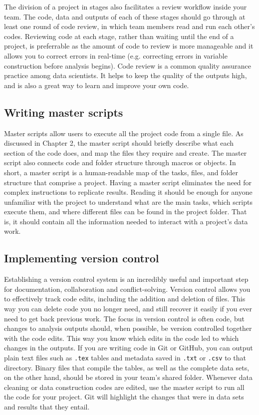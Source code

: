 The division of a project in stages also facilitates a review workflow inside your team.
The code, data and outputs of each of these stages should go through at least one round of code review,
in which team members read and run each other's codes.
Reviewing code at each stage, rather than waiting until the end of a project,
is preferrable as the amount of code to review is more manageable and 
it allows you to correct errors in real-time (e.g. correcting errors in variable construction before analysis begins). 
Code review is a common quality assurance practice among data scientists.
It helps to keep the quality of the outputs high, and is also a great way to learn and improve your own code.

\subsection{Writing master scripts}

Master scripts allow users to execute all the project code from a single file.
As discussed in Chapter 2, the master script should briefly describe what each 
section of the code does, and map the files they require and create.
The master script also connects code and folder structure through macros or objects.
In short, a master script is a human-readable map of the tasks,
files, and folder structure that comprise a project.
Having a master script eliminates the need for complex instructions to replicate results.
Reading it should be enough for anyone unfamiliar with the project
to understand what are the main tasks, which scripts execute them,
and where different files can be found in the project folder.
That is, it should contain all the information needed to interact with a project's data work.

\subsection{Implementing version control}

Establishing a version control system is an incredibly useful
and important step for documentation, collaboration and conflict-solving.
Version control allows you to effectively track code edits,
including the addition and deletion of files.
This way you can delete code you no longer need,
and still recover it easily if you ever need to get back previous work.
The focus in version control is often code, but changes to analysis outputs should, when possible, be version controlled together with the code edits.
This way you know which edits in the code led to which changes in the outputs.
If you are writing code in Git or GitHub,
you can output plain text files such as \texttt{.tex} tables
and metadata saved in \texttt{.txt} or \texttt{.csv} to that directory.
Binary files that compile the tables,
as well as the complete data sets, on the other hand,
should be stored in your team's shared folder.
Whenever data cleaning or data construction codes are edited,
use the master script to run all the code for your project.
Git will highlight the changes that were in data sets and results that they entail.

